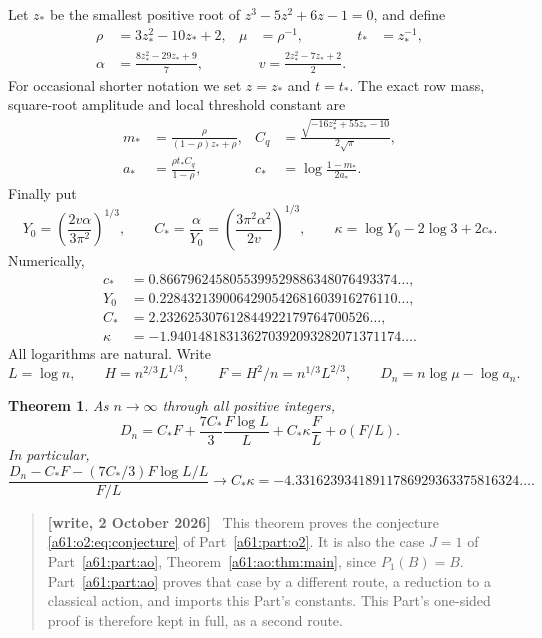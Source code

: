 \documentclass[11pt,letterpaper]{article}
\numberwithin{equation}{section}
\newtheorem{theorem}{Theorem}[section]
\theoremstyle{remark}\newtheorem{remark}[theorem]{Remark}
\newenvironment{writenote}{\par\smallskip\begin{quote}\small\textbf{[write, 2 October 2026]}\ }{\end{quote}\smallskip}
\begin{document}
Let $z_*$ be the smallest positive root of
$z^3-5z^2+6z-1=0$, and define
\begin{align*}
 \rho&=3z_*^2-10z_*+2,& \mu&=\rho^{-1},&t_*&=z_*^{-1},\\
 \alpha&=\frac{8z_*^2-29z_*+9}{7},&&
 v=\frac{2z_*^2-7z_*+2}{2}.
\end{align*}
For occasional shorter notation we set $z=z_*$ and $t=t_*$.
The exact row mass, square-root amplitude and local threshold constant are
\begin{align*}
 m_*&=\frac{\rho}{(1-\rho)z_*+\rho},&
 C_q&=\frac{\sqrt{-16z_*^2+55z_*-10}}{2\sqrt\pi},\\
 a_*&=\frac{\rho t_*C_q}{1-\rho},&
 c_*&=\log\frac{1-m_*}{2a_*}.
\end{align*}
Finally put
\begin{equation}\label{a61:o3:eq:constants}
 Y_0=\left(\frac{2v\alpha}{3\pi^2}\right)^{1/3},\qquad
 C_*=\frac\alpha{Y_0}
     =\left(\frac{3\pi^2\alpha^2}{2v}\right)^{1/3},\qquad
 \kappa=\log Y_0-2\log3+2c_*.
\end{equation}
Numerically,
\begin{align*}
 c_*&=0.8667962458055399529886348076493374\ldots,\\
 Y_0&=0.2284321390064290542681603916276110\ldots,\\
 C_*&=2.232625307612844922179764700526\ldots,\\
 \kappa&=-1.940148183136270392093282071371174\ldots.
\end{align*}
All logarithms are natural. Write
\[
 L=\log n,\qquad H=n^{2/3}L^{1/3},\qquad
 F=H^2/n=n^{1/3}L^{2/3},\qquad D_n=n\log\mu-\log a_n.
\]

\begin{theorem}\label{a61:o3:thm:main}
As $n\to\infty$ through all positive integers,
\begin{equation}\label{a61:o3:eq:main}
 D_n=C_*F+\frac{7C_*}{3}\frac{F\log L}{L}
                    +C_*\kappa\frac FL+o(F/L).
\end{equation}
In particular,
\[
 \frac{D_n-C_*F-(7C_*/3)F\log L/L}{F/L}
       \longrightarrow C_*\kappa
       =-4.33162393418911786929363375816324\ldots.
\]
\end{theorem}
\begin{writenote}
This theorem proves the conjecture \eqref{a61:o2:eq:conjecture} of Part~\ref{a61:part:o2}. It is also the case $J=1$ of Part~\ref{a61:part:ao}, Theorem~\ref{a61:ao:thm:main}, since $P_1(B)=B$. Part~\ref{a61:part:ao} proves that case by a different route, a reduction to a classical action, and imports this Part's constants. This Part's one-sided proof is therefore kept in full, as a second route.
\end{writenote}
\end{document}
